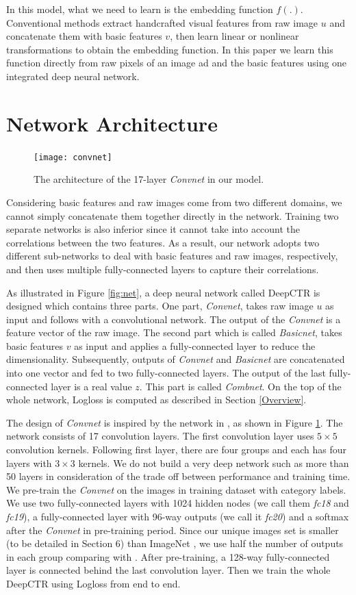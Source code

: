 \documentclass{sig-alternate-05-2015}
\begin{document}
In this model, what we need to learn is the embedding function $f(.)$. Conventional methods extract handcrafted visual features from raw image $u$ and concatenate them with basic features $v$, then learn linear or nonlinear transformations to obtain the embedding function. In this paper we learn this function directly from raw pixels of an image ad and the basic features using one integrated deep neural network.  
\section{Network Architecture}
\begin{figure}
	\centering
	\texttt{[image: convnet]}
	\caption{The architecture of the 17-layer \emph{Convnet} in our model.}
	\label{fig:convnet}
\end{figure}
Considering basic features and raw images come from two different domains, we cannot simply concatenate them together directly in the network. Training two separate networks is also inferior since it cannot take into account the correlations between the two features. As a result, our network adopts two different sub-networks to deal with basic features and raw images, respectively, and then uses multiple fully-connected layers to capture their correlations. 

As illustrated in Figure \ref{fig:net},  a  deep neural network called DeepCTR is designed which contains three parts. 
One part, \emph{Convnet}, takes raw image $u$ as input and follows with a convolutional network. 
The output of the \emph{Convnet} is a feature vector of the raw image. 
The second part which is called \emph{Basicnet}, takes basic features $v$ as input and applies a fully-connected layer to reduce the dimensionality. 
Subsequently, outputs of \emph{Convnet} and \emph{Basicnet} are concatenated into one vector and fed to two fully-connected layers. 
The output of the last fully-connected layer is a real value $z$.
This part is called \emph{Combnet}. On the top of the whole network, Logloss is computed as described in Section \ref{Overview}.

The design of \emph{Convnet} is inspired by the network in \cite{he2015deep,simonyan2014very}, as shown in Figure \ref{fig:convnet}. The network consists of 17 convolution layers. The first convolution layer uses $5 \times 5$ convolution kernels. Following first layer, there are four groups and each has four layers with $3 \times 3$ kernels.  We do not build a very deep network such as more than 50 layers in consideration of the trade off between performance and training time. We pre-train the \emph{Convnet} on the images in training dataset with category labels. We use two fully-connected layers with 1024 hidden nodes (we call them \emph{fc18} and \emph{fc19}), a fully-connected layer with 96-way outputs (we call it \emph{fc20}) and a softmax after the \emph{Convnet} in pre-training period.  Since our unique images set is smaller (to be detailed in Section 6) than ImageNet \cite{deng2009imagenet}, we use half the number of outputs in each group comparing with \cite{he2015deep}. After pre-training,  a 128-way fully-connected layer is connected behind the last convolution layer.  Then we train the whole DeepCTR using Logloss from end to end.
\end{document}
